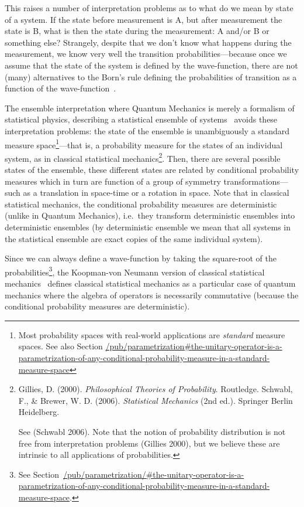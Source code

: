 \documentclass[11pt]{book}
\begin{document}
This raises a number of interpretation problems as to what do we mean by
state of a system. If the state before measurement is A, but after
measurement the state is B, what is then the state during the
measurement: A and/or B or something else? Strangely, despite that we
don't know what happens during the measurement, we know very well the
transition probabilities---because once we assume that the state of the
system is defined by the wave-function, there are not (many)
alternatives to the Born's rule defining the probabilities of transition
as a function of the
wave-function~\cite{Gleason1957Measures}\cite{Dvurecenskij2013Gleasonux2019s}.

The ensemble interpretation where Quantum Mechanics is merely a
formalism of statistical physics, describing a statistical ensemble of
systems~\cite{Home1992Ensemble}\cite{Ballentine1998Quantum}
avoids these interpretation problems: the state of the ensemble is
unambiguously a standard measure space\footnote{Most probability spaces
  with real-world applications are \emph{standard} measure spaces. See
  also Section
  \url{/pub/parametrization\#the-unitary-operator-is-a-parametrization-of-any-conditional-probability-measure-in-a-standard-measure-space}}---that
is, a probability measure for the states of an individual system, as in
classical statistical mechanics\footnote{Gillies, D. (2000).
  \emph{Philosophical Theories of Probability}. Routledge. Schwabl, F.,
  \& Brewer, W. D. (2006). \emph{Statistical Mechanics} (2nd ed.).
  Springer Berlin Heidelberg.

  See (Schwabl 2006). Note that the notion of probability distribution
  is not free from interpretation problems (Gillies 2000), but we
  believe these are intrinsic to all applications of probabilities.}.
Then, there are several possible states of the ensemble, these different
states are related by conditional probability measures which in turn are
function of a group of symmetry transformations---such as a translation
in space-time or a rotation in space. Note that in classical statistical
mechanics, the conditional probability measures are deterministic
(unlike in Quantum Mechanics), i.e.~they transform deterministic
ensembles into deterministic ensembles (by deterministic ensemble we
mean that all systems in the statistical ensemble are exact copies of
the same individual system).

Since we can always define a wave-function by taking the square-root of
the probabilities\footnote{See
  Section~\url{/pub/parametrization/\#the-unitary-operator-is-a-parametrization-of-any-conditional-probability-measure-in-a-standard-measure-space}.},
the Koopman-von Neumann version of classical statistical
mechanics~\cite{Sudarshan1976Interaction} defines classical statistical mechanics as a particular case of
quantum mechanics where the algebra of operators is necessarily
commutative (because the conditional probability measures are
deterministic).
\end{document}

